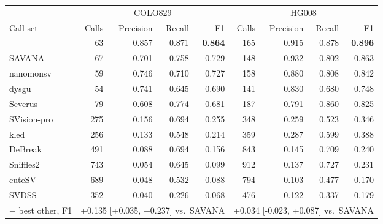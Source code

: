 \begin{tabular}{lrrrrrrrr}
\toprule
 & \multicolumn{4}{c}{COLO829} & \multicolumn{4}{c}{HG008} \\
Call set & Calls & Precision & Recall & F1 & Calls & Precision & Recall & F1 \\
\midrule
\tool{} & 63 & 0.857 & 0.871 & \textbf{0.864} & 165 & 0.915 & 0.878 & \textbf{0.896} \\
SAVANA & 67 & 0.701 & 0.758 & 0.729 & 148 & 0.932 & 0.802 & 0.863 \\
nanomonsv & 59 & 0.746 & 0.710 & 0.727 & 158 & 0.880 & 0.808 & 0.842 \\
dysgu & 54 & 0.741 & 0.645 & 0.690 & 141 & 0.830 & 0.680 & 0.748 \\
Severus & 79 & 0.608 & 0.774 & 0.681 & 187 & 0.791 & 0.860 & 0.825 \\
SVision-pro & 275 & 0.156 & 0.694 & 0.255 & 348 & 0.259 & 0.523 & 0.346 \\
kled & 256 & 0.133 & 0.548 & 0.214 & 359 & 0.287 & 0.599 & 0.388 \\
DeBreak & 491 & 0.088 & 0.694 & 0.156 & 843 & 0.145 & 0.709 & 0.240 \\
Sniffles2 & 743 & 0.054 & 0.645 & 0.099 & 912 & 0.137 & 0.727 & 0.231 \\
cuteSV & 689 & 0.048 & 0.532 & 0.088 & 794 & 0.103 & 0.477 & 0.170 \\
SVDSS & 352 & 0.040 & 0.226 & 0.068 & 476 & 0.122 & 0.337 & 0.179 \\
\midrule
\tool{} $-$ best other, F1 & \multicolumn{4}{r}{+0.135 [+0.035, +0.237] vs.\ SAVANA} & \multicolumn{4}{r}{+0.034 [-0.023, +0.087] vs.\ SAVANA} \\
\bottomrule
\end{tabular}
